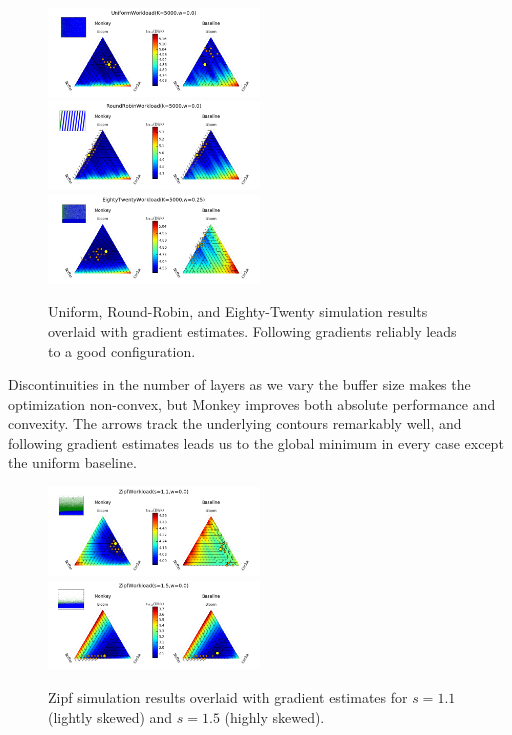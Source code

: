 \documentclass{sig-alternate-05-2015}
\begin{document}
\begin{figure}[H]
\begin{center}
\includegraphics[width=0.5\textwidth]{uniformquiv1.png}
\includegraphics[width=0.5\textwidth]{robinquiv1.png}
\includegraphics[width=0.5\textwidth]{eightwenquiv2.png}
\end{center}
\caption{Uniform, Round-Robin, and Eighty-Twenty simulation results overlaid with
gradient estimates. Following gradients reliably leads to a good configuration.}
\label{fig:basicquiv}
\end{figure}

Discontinuities in the number of layers as we vary the buffer size makes the
optimization non-convex, but Monkey improves both absolute performance and
convexity. The arrows track the underlying contours remarkably well, and
following gradient estimates leads us to the global minimum in every case
except the uniform baseline.

\begin{figure}[H]
\begin{center}
\includegraphics[width=0.5\textwidth]{zipfquiv1.png}
\includegraphics[width=0.5\textwidth]{zipfquiv2.png}
\end{center}
\caption{Zipf simulation results overlaid with gradient estimates for $s=1.1$
(lightly skewed) and $s=1.5$ (highly skewed).}
\label{fig:zipfquiv}
\end{figure}
\end{document}
